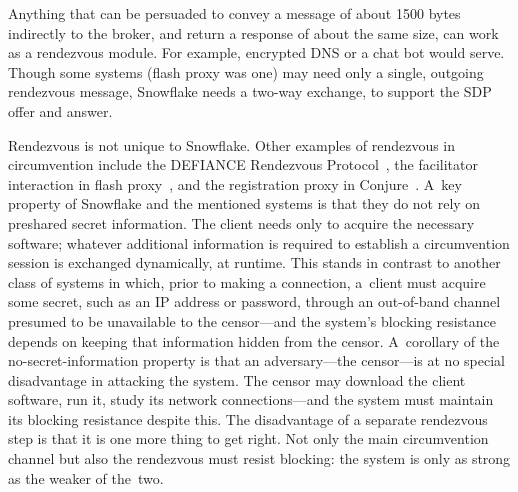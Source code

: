 \documentclass[letterpaper,twocolumn]{article}
\begin{document}
Anything that can be persuaded to convey a message
of about 1500 bytes indirectly to the broker,
and return a response of about the same size,
can work as a rendezvous module.
For example, encrypted DNS
or a chat bot
would serve.
Though some systems (flash proxy was one)
may need only a single, outgoing rendezvous message,
Snowflake needs a two-way exchange,
to support the SDP offer and answer.

Rendezvous is not unique to Snowflake.
Other examples of rendezvous in circumvention include
the DEFIANCE Rendezvous Protocol~\cite[\S 3]{Lincoln2012a},
the facilitator interaction in flash proxy~\cite[\S 3]{Fifield2012a},
and the registration proxy in Conjure~\cite[\S 4.1]{Frolov2019b}.
A~key property of Snowflake and the mentioned systems
is that they do not rely on preshared secret information.
The client needs only to acquire the necessary software;
whatever additional information is required to establish a circumvention session
is exchanged dynamically, at runtime.
This stands in contrast to another class of systems in which,
prior to making a connection,
a~client must acquire some secret,
such as an IP address or password,
through an out-of-band channel
presumed to be unavailable to the censor---and
the system's blocking resistance depends on
keeping that information hidden from the censor.
A~corollary of the no-secret-information property
is that an adversary---the censor---is
at no special disadvantage in attacking the system.
The censor may download the client software,
run it, study its network connections---and
the system must maintain its blocking resistance despite this.
The disadvantage of a separate rendezvous step
is that it is one more thing to get right.
Not only the main circumvention channel
but also the rendezvous must resist blocking:
the system is only as strong as the weaker of the~two.
\end{document}
